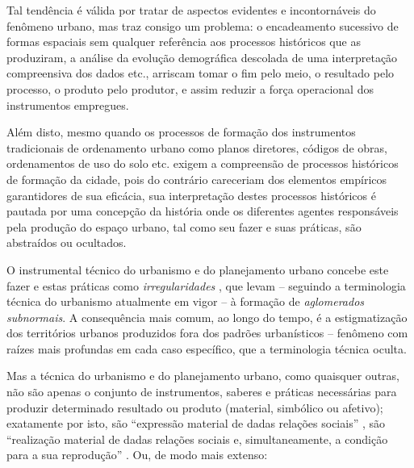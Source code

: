Tal tendência é válida por tratar de aspectos evidentes e incontornáveis do fenômeno urbano, mas traz consigo um problema: o encadeamento sucessivo de formas espaciais sem qualquer referência aos processos históricos que as produziram, a análise da evolução demográfica descolada de uma interpretação compreensiva dos dados etc., arriscam tomar o fim pelo meio, o resultado pelo processo, o produto pelo produtor, e assim reduzir a força operacional dos instrumentos empregues.

Além disto, mesmo quando os processos de formação dos instrumentos tradicionais de ordenamento urbano como planos diretores, códigos de obras, ordenamentos de uso do solo etc. exigem a compreensão de processos históricos de formação da cidade, pois do contrário careceriam dos elementos empíricos garantidores de sua eficácia, sua interpretação destes processos históricos é pautada por uma concepção da história onde os diferentes agentes responsáveis pela produção do espaço urbano, tal como seu fazer e suas práticas, são abstraídos ou ocultados. 

O instrumental técnico do urbanismo e do planejamento urbano concebe este fazer e estas práticas como \textit{irregularidades} \cite[p.~181-210]{ROLNIK2007}, que levam – seguindo a terminologia técnica do urbanismo atualmente em vigor – à formação de \textit{aglomerados subnormais}. A consequência mais comum, ao longo do tempo, é a estigmatização dos territórios urbanos produzidos fora dos padrões urbanísticos – fenômeno com raízes mais profundas em cada caso específico, que a terminologia técnica oculta.

Mas a técnica do urbanismo e do planejamento urbano, como quaisquer outras, não são apenas o conjunto de instrumentos, saberes e práticas necessárias para produzir determinado resultado ou produto (material, simbólico ou afetivo); exatamente por isto, são ``expressão material de dadas relações sociais'' \cite[p.~266]{BERNARDO1977c}, são ``realização material de dadas relações sociais e, simultaneamente, a condição para a sua reprodução'' \cite[p.~285]{BERNARDO1977c}. Ou, de modo mais extenso:

